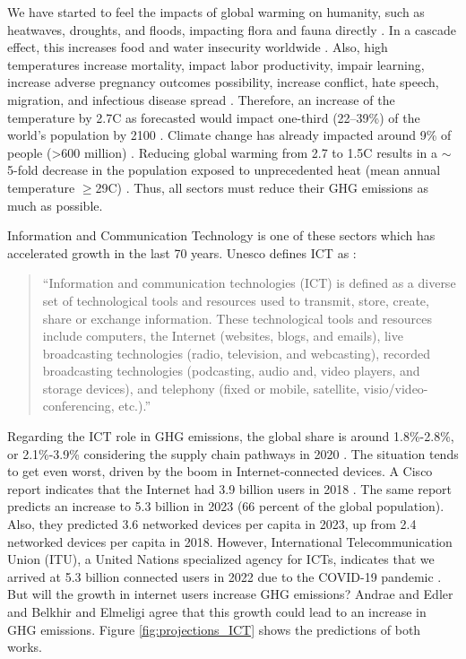 We have started to feel the impacts of global warming on humanity, such as heatwaves, droughts, and floods, impacting flora and fauna directly \cite{masson2018global, change2022threat}. In a cascade effect, this increases food and water insecurity worldwide \cite{change2022threat, doi:10.1126/science.1239402}. Also, high temperatures increase mortality, impact labor productivity, impair learning, increase adverse pregnancy outcomes possibility, increase conflict, hate speech, migration, and infectious disease spread \cite{lenton2023quantifying}. Therefore, an increase of the temperature by 2.7\degree C as forecasted would impact one-third (22–39\%) of the world's population by 2100 \cite{lenton2023quantifying}. Climate change has already impacted around 9\% of people (>600 million) \cite{lenton2023quantifying}. Reducing global warming from 2.7 to 1.5\degree C results in a $\sim$5-fold decrease in the population exposed to unprecedented heat (mean annual temperature $\geq$29\degree C) \cite{lenton2023quantifying}. Thus, all sectors must reduce their GHG emissions as much as possible.

Information and Communication Technology is one of these sectors which has accelerated growth in the last 70 years. Unesco defines ICT as \cite{unesco2009guide}:

\begin{quote}
    ``Information and communication technologies (ICT) is defined as a diverse set of technological tools and resources used to transmit, store, create, share or exchange information. These technological tools and resources include computers, the Internet (websites, blogs, and emails), live broadcasting technologies (radio, television, and webcasting), recorded broadcasting technologies (podcasting, audio and, video players, and storage devices), and telephony (fixed or mobile, satellite, visio/video-conferencing, etc.).''
\end{quote}

Regarding the ICT role in GHG emissions, the global share is around 1.8\%-2.8\%, or 2.1\%-3.9\% considering the supply chain pathways in 2020 \cite{freitag2021climate}. The situation tends to get even worst, driven by the boom in Internet-connected devices. A Cisco report indicates that the Internet had 3.9 billion users in 2018 \cite{cisco2020cisco}. The same report predicts an increase to 5.3 billion in 2023 (66 percent of the global population). Also, they predicted 3.6 networked devices per capita in 2023, up from 2.4 networked devices per capita in 2018. However, International Telecommunication Union (ITU), a United Nations specialized agency for ICTs, indicates that we arrived at 5.3 billion connected users in 2022 due to the COVID-19 pandemic \cite{ITU2022}. But will the growth in internet users increase GHG emissions? Andrae and Edler \cite{andrae2015global} and Belkhir and Elmeligi \cite{belkhir2018assessing} agree that this growth could lead to an increase in GHG emissions. Figure \ref{fig:projections_ICT} shows the predictions of both works.


